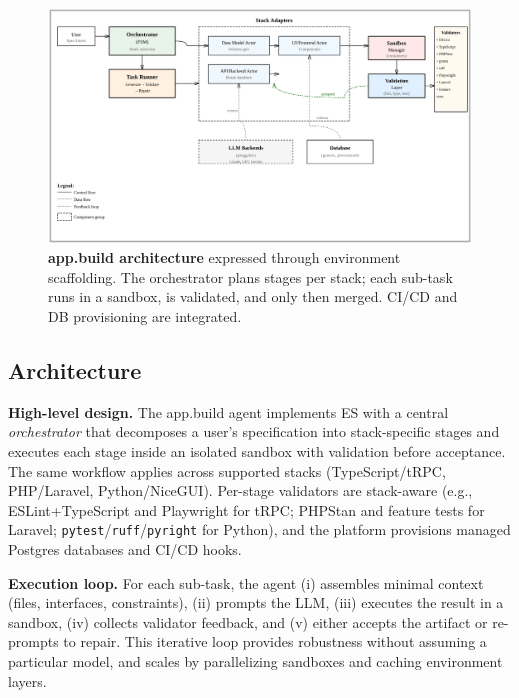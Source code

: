 \documentclass{article}
\begin{document}
\begin{figure}[t]
  \centering
  \includegraphics[width=\linewidth]{diagrams/appbuild-arch.png}
  \vspace{-0.5em}
  \caption{\textbf{app.build architecture} expressed through environment scaffolding. The orchestrator plans stages per stack; each sub-task runs in a sandbox, is validated, and only then merged. CI/CD and DB provisioning are integrated.}
  \label{fig:appbuild-arch}
\end{figure}

\subsection{Architecture}

\textbf{High-level design.} The app.build agent implements ES with a central \emph{orchestrator} that decomposes a user's specification into stack-specific stages and executes each stage inside an isolated sandbox with validation before acceptance. The same workflow applies across supported stacks (TypeScript/tRPC, PHP/Laravel, Python/NiceGUI). Per-stage validators are stack-aware (e.g., ESLint+TypeScript and Playwright for tRPC; PHPStan and feature tests for Laravel; \texttt{pytest}/\texttt{ruff}/\texttt{pyright} for Python), and the platform provisions managed Postgres databases and CI/CD hooks.

\textbf{Execution loop.} For each sub-task, the agent (i) assembles minimal context (files, interfaces, constraints), (ii) prompts the LLM, (iii) executes the result in a sandbox, (iv) collects validator feedback, and (v) either accepts the artifact or re-prompts to repair. This iterative loop provides robustness without assuming a particular model, and scales by parallelizing sandboxes and caching environment layers.
\end{document}
